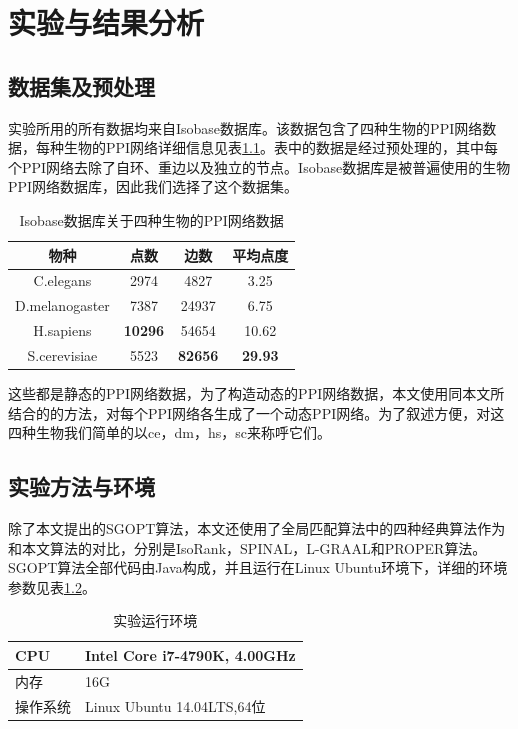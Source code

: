 \chapter{实验与结果分析}

\section{数据集及预处理}
实验所用的所有数据均来自Isobase数据库\cite{park2011isobase}。该数据包含了四种生物的PPI网络数据，每种生物的PPI网络详细信息见表\ref{table:1}。表中的数据是经过预处理的，其中每个PPI网络去除了自环、重边以及独立的节点。Isobase数据库是被普遍使用的生物PPI网络数据库，因此我们选择了这个数据集。


\begin{table}[htbp]
    \centering
    \caption{Isobase数据库关于四种生物的PPI网络数据}
    \label{table:1}
    \begin{tabular}{cccc}
         \hline 物种&点数&边数&平均点度\\
         \hline C.elegans&2974&4827&3.25\\
         D.melanogaster&7387&24937&6.75\\
         H.sapiens&\bf{10296}&54654&10.62\\
         S.cerevisiae&5523&\bf{82656}&\bf{29.93}\\
         \hline
    \end{tabular}
\end{table}

这些都是静态的PPI网络数据，为了构造动态的PPI网络数据，本文使用\cite{zhang2016method}同本文所结合的的方法，对每个PPI网络各生成了一个动态PPI网络。为了叙述方便，对这四种生物我们简单的以ce，dm，hs，sc来称呼它们。

\section{实验方法与环境}
除了本文提出的SGOPT算法，本文还使用了全局匹配算法中的四种经典算法作为和本文算法的对比，分别是IsoRank\cite{singh2008global}，SPINAL\cite{aladaug2013spinal}，L-GRAAL\cite{malod2015graal}和PROPER\cite{kazemi2016proper}算法。SGOPT算法全部代码由Java构成，并且运行在Linux Ubuntu环境下，详细的环境参数见表\ref{table:2}。

\begin{table}[htbp]
    \centering
    \caption{实验运行环境}
    \label{table:2}
    \begin{tabular}{l|l}
         \hline 
         CPU&Intel Core i7-4790K, 4.00GHz\\
         \hline
         内存&16G\\
         \hline
         操作系统&Linux Ubuntu 14.04LTS,64位\\
         \hline
    \end{tabular}
\end{table}

